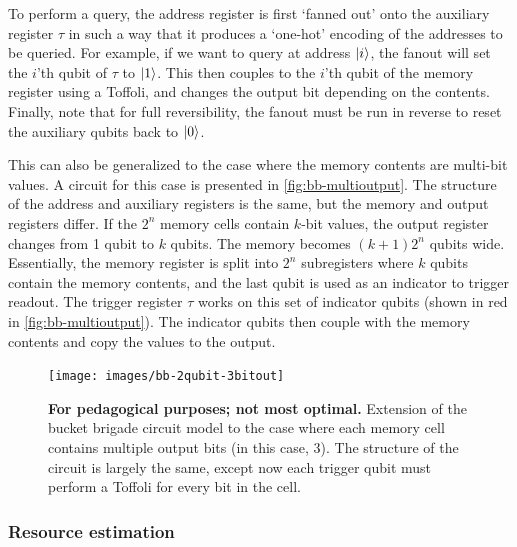 \documentclass[a4paper,12pt]{article}
\begin{document}
To perform a query, the address register is first `fanned out' onto the auxiliary register $\tau$ in such a way that it produces a `one-hot' encoding of the addresses to be queried. 
For example, if we want to query at address $\ket{i}$, the fanout will set the $i$'th qubit of $\tau$ to $\ket{1}$. 
This then couples to the $i$'th qubit of the memory register using a Toffoli, and changes the output bit depending on the contents. 
Finally, note that for full reversibility, the fanout must be run in reverse to reset the auxiliary qubits back to $\ket{0}$. 

This can also be generalized to the case where the memory contents are multi-bit values. 
A circuit for this case is presented in \autoref{fig:bb-multioutput}. 
The structure of the address and auxiliary registers is the same, but the memory and output registers differ. 
If the $2^n$ memory cells contain $k$-bit values, the output register changes from 1 qubit to $k$ qubits.
The memory becomes $(k+1)2^n$ qubits wide. 
Essentially, the memory register is split into $2^n$ subregisters where $k$ qubits contain the memory contents, and the last qubit is used as an indicator to trigger readout. 
The trigger register $\tau$ works on this set of indicator qubits (shown in red in \autoref{fig:bb-multioutput}). 
The indicator qubits then couple with the memory contents and copy the values to the output.

\begin{figure}
 \centering
 \captionsetup{width=.89\linewidth}
 \texttt{[image: images/bb-2qubit-3bitout]}
 \caption{\textbf{For pedagogical purposes; not most optimal.} 
 Extension of the bucket brigade circuit model to the case where each memory cell contains multiple output bits (in this case, 3). 
 The structure of the circuit is largely the same, except now each trigger qubit must perform a Toffoli for every bit in the cell.}
 \label{fig:bb-multioutput}
\end{figure}


\subsubsection{Resource estimation}
\end{document}
